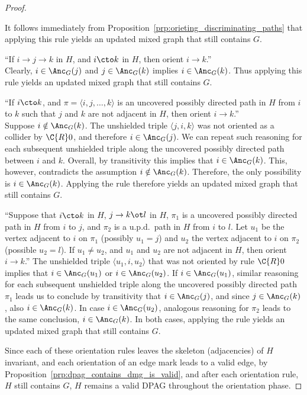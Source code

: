 \begin{proof}
\begin{description}
      It follows immediately from Proposition~\ref{prp:orieting_discriminating_paths} that applying this rule yields an updated mixed graph that still contains $G$.
    \item[$\C{R}8$] ``If $i \to j \to k$ in $H$, and $i \cto k$ in $H$, then orient $i \to k$.''\\
      Clearly, $i \in \Anc_G(j)$ and $j \in \Anc_G(k)$ implies $i \in \Anc_G(k)$.
      Thus applying this rule yields an updated mixed graph that still contains $G$.
    \item[$\C{R}9$] ``If $i \cto k$, and $\pi = \langle i, j, \dots, k \rangle$ is an uncovered possibly directed path in $H$ from $i$ to $k$ such that $j$ and $k$ are not adjacent in $H$, then orient $i \to k$.''\\
      Suppose $i \notin \Anc_G(k)$.
      The unshielded triple $\langle j, i, k \rangle$ was not oriented as a collider by $\C{R}0$, and therefore $i \in \Anc_G(j)$.
      We can repeat such reasoning for each subsequent unshielded triple along the uncovered possibly directed path between $i$ and $k$.
      Overall, by transitivity this implies that $i \in \Anc_G(k)$.
      This, however, contradicts the assumption $i \notin \Anc_G(k)$.
      Therefore, the only possibility is $i \in \Anc_G(k)$.
      Applying the rule therefore yields an updated mixed graph that still contains $G$.
    \item[$\C{R}10$] ``Suppose that $i \cto k$ in $H$, $j \to k \ot l$ in $H$, $\pi_1$ is a uncovered possibly directed path in $H$ from $i$ to $j$, and $\pi_2$ is a u.p.d.\ path in $H$ from $i$ to $l$. Let $u_1$ be the vertex adjacent to $i$ on $\pi_1$ (possibly $u_1 = j$) and $u_2$ the vertex adjacent to $i$ on $\pi_2$ (possible $u_2 = l$). If $u_1 \ne u_2$, and $u_1$ and $u_2$ are not adjacent in $H$, then orient $i \to k$.''
      The unshielded triple $\langle u_1, i, u_2 \rangle$ that was not oriented by rule $\C{R}0$ implies that $i \in \Anc_G(u_1)$ or $i \in \Anc_G(u_2)$.
      If $i \in \Anc_G(u_1)$, similar reasoning for each subsequent unshielded triple along the uncovered possibly directed path $\pi_1$ leads us to conclude by transitivity that $i \in \Anc_G(j)$, and since $j \in \Anc_G(k)$, also $i \in \Anc_G(k)$.
      In case $i \in \Anc_G(u_2)$, analogous reasoning for $\pi_2$ leads to the same conclusion, $i \in \Anc_G(k)$.
      In both cases, applying the rule yields an updated mixed graph that still contains $G$.
  \end{description}
  Since each of these orientation rules leaves the skeleton (adjacencies) of $H$ invariant,
  and each orientation of an edge mark leads to a valid edge,
  by Proposition~\ref{prp:dpag_contains_dmg_is_valid}, 
  and after each orientation rule, $H$ still contains $G$,
  $H$ remains a valid DPAG throughout the orientation phase.
\end{proof}

